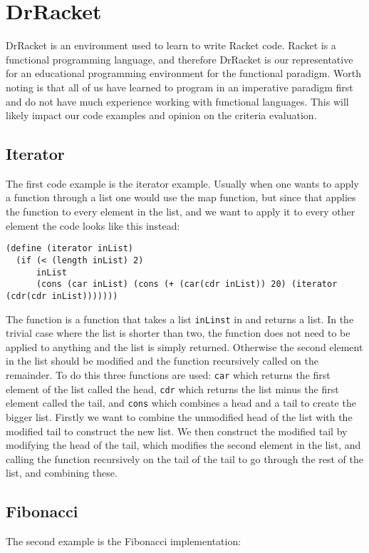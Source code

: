 \section{DrRacket}
\label{sec:drracket}
DrRacket is an environment used to learn to write Racket code.
Racket is a functional programming language, and therefore DrRacket is our representative for an educational programming environment for the functional paradigm.
Worth noting is that all of us have learned to program in an imperative paradigm first and do not have much experience working with functional languages.
This will likely impact our code examples and opinion on the criteria evaluation.

\subsection{Iterator}
The first code example is the iterator example.
Usually when one wants to apply a function through a list one would use the map function, but since that applies the function to every element in the list, and we want to apply it to every other element the code looks like this instead:

\begin{lstlisting}
(define (iterator inList)
  (if (< (length inList) 2)
      inList
      (cons (car inList) (cons (+ (car(cdr inList)) 20) (iterator (cdr(cdr inList)))))))
\end{lstlisting}

The function is a function that takes a list \lstinline!inLinst! in and returns a list.
In the trivial case where the list is shorter than two, the function does not need to be applied to anything and the list is simply returned.
Otherwise the second element in the list should be modified and the function recursively called on the remainder.
To do this three functions are used:
\lstinline!car! which returns the first element of the list called the head, \lstinline!cdr! which returns the list minus the first element called the tail, and \lstinline!cons! which combines a head and a tail to create the bigger list.
Firstly we want to combine the unmodified head of the list with the modified tail to construct the new list.
We then construct the modified tail by modifying the head of the tail, which modifies the second element in the list, and calling the function recursively on the tail of the tail to go through the rest of the list, and combining these.

\subsection{Fibonacci}
The second example is the Fibonacci implementation:

